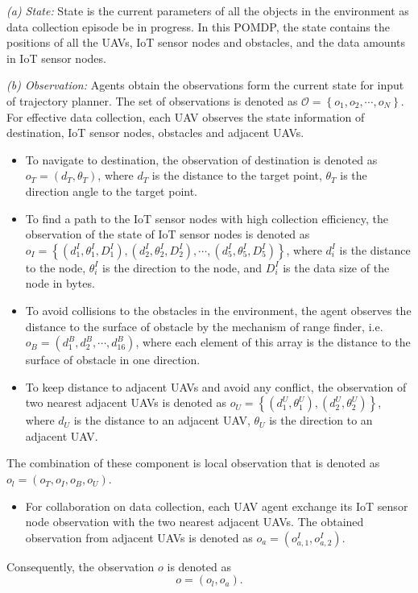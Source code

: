 \documentclass[journal]{IEEEtran}
\begin{document}
\textit{(a) State:} State is the current parameters of all the objects in the environment as data collection episode be in progress. In this POMDP, the state contains the positions of all the UAVs, IoT sensor nodes and obstacles, and the data amounts in IoT sensor nodes. 

\textit{(b) Observation:} Agents obtain the observations form the current state for input of trajectory planner. The set of observations is denoted as $\mathcal{O}=\left\{o_1, o_2, \cdots, o_N\right\}$. For effective data collection, each UAV observes the state information of destination, IoT sensor nodes, obstacles and adjacent UAVs. 
\begin{itemize}
  \item To navigate to destination, the observation of destination is denoted as $o_{T}=\left(d_{T}, \theta_{T}\right)$, where $d_{T}$ is the distance to the target point, $\theta_{T}$ is the direction angle to the target point.
  \item To find a path to the IoT sensor nodes with high collection efficiency, the observation of the state of IoT sensor nodes is denoted as $o_{I}=\left\{\left(d^{I}_{1},\theta^{I}_{1},D^{I}_{1}\right),\left(d^{I}_{2},\theta^{I}_{2},D^{I}_{2}\right),\cdots,\left(d^{I}_{5},\theta^{I}_{5},D^{I}_{5}\right)\right\}$, where $d^{I}_{i}$ is the distance to the node, $\theta^{I}_{i}$ is the direction to the node, and $D^{I}_{i}$ is the data size of the node in bytes.
  \item To avoid collisions to the obstacles in the environment, the agent observes the distance to the surface of obstacle by the mechanism of range finder, i.e. $o_{B}=\left(d^{B}_{1}, d^{B}_{2}, \cdots , d^{B}_{16}\right)$, where each element of this array is the distance to the surface of obstacle in one direction. 
  \item To keep distance to adjacent UAVs and avoid any conflict, the observation of two nearest adjacent UAVs is denoted as $o_{U}=\left\{\left(d_{1}^{U}, \theta_{1}^{U}\right), \left(d_{2}^{U}, \theta_{2}^{U}\right)\right\}$, where $d_{U}$ is the distance to an adjacent UAV, $\theta_{U}$ is the direction to an adjacent UAV. 
\end{itemize}
The combination of these component is local observation that is denoted as $o_{l}=\left({o_{T},o_{I},o_{B},o_{U}}\right)$. 
\begin{itemize}
  \item For collaboration on data collection, each UAV agent exchange its IoT sensor node observation with the two nearest adjacent UAVs. The obtained observation from adjacent UAVs is denoted as $o_{a}=\left(o^{I}_{a,1},o^{I}_{a,2}\right)$. 
\end{itemize}
Consequently, the observation $o$ is denoted as 
\begin{equation}\label{obs}
  o=\left({o_{l},o_{a}}\right). 
\end{equation}
\end{document}
